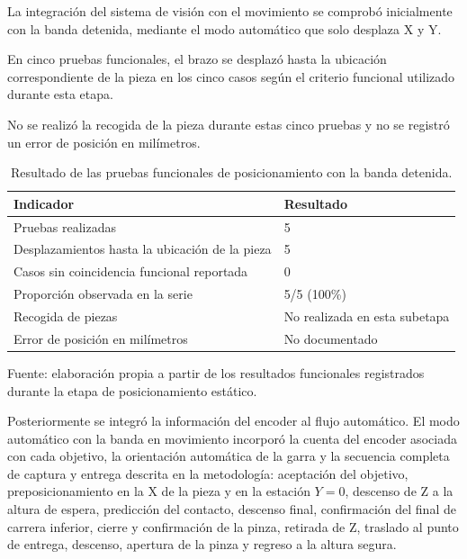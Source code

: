 La integración del sistema de visión con el movimiento se comprobó inicialmente con la banda detenida, mediante el modo automático que solo desplaza X y Y.

En cinco pruebas funcionales, el brazo se desplazó hasta la ubicación correspondiente de la pieza en los cinco casos según el criterio funcional utilizado durante esta etapa.

No se realizó la recogida de la pieza durante estas cinco pruebas y no se registró un error de posición en milímetros.

\begin{table}[H]
    \centering
    \caption{Resultado de las pruebas funcionales de posicionamiento con la banda detenida.}
    \label{tab:fase5_prueba_estatica}
    \begin{tabular}{p{}p{}}
        \hline
        Indicador & Resultado \\
        \hline
        Pruebas realizadas & 5 \\
        Desplazamientos hasta la ubicación de la pieza & 5 \\
        Casos sin coincidencia funcional reportada & 0 \\
        Proporción observada en la serie & 5/5 (100\%) \\
        Recogida de piezas & No realizada en esta subetapa \\
        Error de posición en milímetros & No documentado \\
        \hline
    \end{tabular}

    \par\small\raggedright Fuente: elaboración propia a partir de los resultados funcionales registrados durante la etapa de posicionamiento estático.
\end{table}

Posteriormente se integró la información del encoder al flujo automático. El modo automático con la banda en movimiento incorporó la cuenta del encoder asociada con cada objetivo, la orientación automática de la garra y la secuencia completa de captura y entrega descrita en la metodología: aceptación del objetivo, preposicionamiento en la X de la pieza y en la estación $Y=0$, descenso de Z a la altura de espera, predicción del contacto, descenso final, confirmación del final de carrera inferior, cierre y confirmación de la pinza, retirada de Z, traslado al punto de entrega, descenso, apertura de la pinza y regreso a la altura segura.

